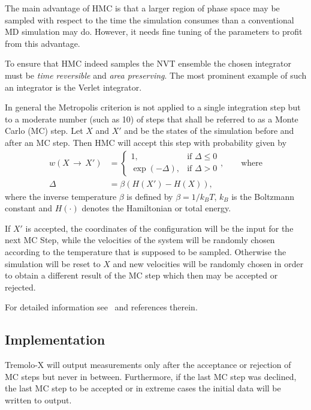 The main advantage of HMC is that a larger region of phase space may be sampled with respect to the time the simulation consumes than a conventional MD simulation may do.
However, it needs fine tuning of the parameters to profit from this advantage.

To ensure that HMC indeed samples the NVT ensemble the chosen integrator must be \textit{time reversible} and \textit{area preserving}. The most prominent example of such an integrator is the Verlet integrator.

In general the Metropolis criterion is not applied to a single integration step but to a moderate number (such as 10) of steps that shall be referred to as a Monte Carlo (MC) step.
Let $X$ and $X'$ and be the states of the simulation before and after an MC step. Then HMC will accept this step with probability given by
\begin{align*}
w\left(X\,\rightarrow\,X'\right) &=
  \begin{cases}
    1,             & \text{if } \Delta\leq 0 \\
    \exp(-\Delta), & \text{if } \Delta > 0
  \end{cases},\qquad\text{where} \\
\Delta &= \beta\left(H(X')-H(X)\right),
\end{align*}
where the inverse temperature $\beta$ is defined by $\beta=1/k_B T$, $k_B$ is the Boltzmann constant and $H(\cdot)$ denotes the Hamiltonian or total energy.

If $X'$ is accepted, the coordinates of the configuration will be the input for the next MC Step, while the velocities of the system will be randomly chosen according to the temperature that is supposed to be sampled.
Otherwise the simulation will be reset to $X$ and new velocities will be randomly chosen in order to obtain a different result of the MC step which then may be accepted or rejected.

For detailed information see~\cite{Mehlig1992} and references therein.

\subsection{Implementation}

Tremolo-X will output measurements only after the acceptance or rejection of MC steps but never in between. Furthermore, if the last MC step was declined, the last MC step to be accepted or in extreme cases the initial data will be written to output.

